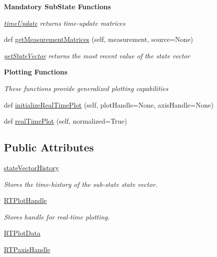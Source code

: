 \begin{Indent}{\bf Mandatory Sub\+State Functions}
\begin{DoxyCompactItemize}
\begin{DoxyCompactList}\small\item\em \hyperlink{classmodest_1_1substates_1_1substate_1_1SubState_a06d147fa5babe4e147b3267e67054ab4}{time\+Update} returns time-\/update matrices \end{DoxyCompactList}\item 
def \hyperlink{classmodest_1_1substates_1_1substate_1_1SubState_a98901b80c96264945362ec50b489a636}{get\+Measurement\+Matrices} (self, measurement, source=None)
\begin{DoxyCompactList}\small\item\em \hyperlink{classmodest_1_1substates_1_1substate_1_1SubState_aa18c8238415131b4b63cef0e4b2ff9fd}{get\+State\+Vector} returns the most recent value of the state vector \end{DoxyCompactList}\end{DoxyCompactItemize}
\end{Indent}
\begin{Indent}{\bf Plotting Functions}\par
{\em These functions provide generalized plotting capabilities }\begin{DoxyCompactItemize}
\item 
def \hyperlink{classmodest_1_1substates_1_1substate_1_1SubState_a1adac64be88eab0a64bb952518c4268f}{initialize\+Real\+Time\+Plot} (self, plot\+Handle=None, axis\+Handle=None)
\item 
def \hyperlink{classmodest_1_1substates_1_1substate_1_1SubState_a2deb7d1ca3105eb20e50fa7e67298355}{real\+Time\+Plot} (self, normalized=True)
\end{DoxyCompactItemize}
\end{Indent}
\subsection*{Public Attributes}
\begin{DoxyCompactItemize}
\item 
\hyperlink{classmodest_1_1substates_1_1substate_1_1SubState_a38c12c9d0899bc1161f3502b584517a2}{state\+Vector\+History}
\begin{DoxyCompactList}\small\item\em Stores the time-\/history of the sub-\/state state vector. \end{DoxyCompactList}\item 
\hyperlink{classmodest_1_1substates_1_1substate_1_1SubState_a37ded775b84cea85b4dce0f1b16286c4}{R\+T\+Plot\+Handle}
\begin{DoxyCompactList}\small\item\em Stores handle for real-\/time plotting. \end{DoxyCompactList}\item 
\hyperlink{classmodest_1_1substates_1_1substate_1_1SubState_a9fefae1facc797a1132fb61a55e9ffa1}{R\+T\+Plot\+Data}
\item 
\hyperlink{classmodest_1_1substates_1_1substate_1_1SubState_a497ccbb6658589b02568e87c6382222e}{R\+T\+Paxis\+Handle}
\end{DoxyCompactItemize}
